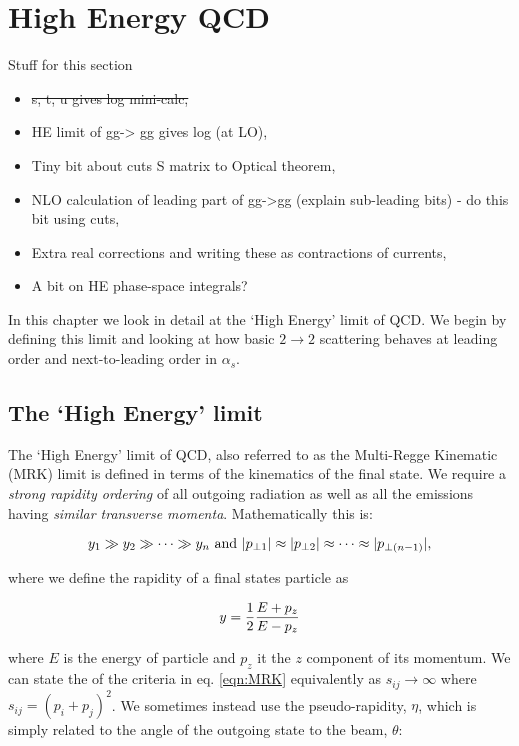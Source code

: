 \chapter{High Energy QCD}
\label{chap:HEQCD}

	{\color{red}
	Stuff for this section
	\begin{itemize}
		\item \st{s, t, u gives log mini-calc,}
		\item HE limit of gg-> gg gives log (at LO),
		\item Tiny bit about cuts S matrix to Optical theorem,
		\item NLO calculation of leading part of gg->gg (explain sub-leading bits) - do this bit using cuts,
		\item Extra real corrections and writing these as contractions of currents,
		\item A bit on HE phase-space integrals?
	\end{itemize}
	}

	In this chapter we look in detail at the `High Energy' limit of QCD.  We begin by defining this limit and
	looking at how basic $2\rightarrow2$ scattering behaves at leading order and next-to-leading order in
	$\alpha_s$.

	\section{The `High Energy' limit}
		\label{sub:HElimit}

		The `High Energy' limit of QCD, also referred to as the Multi-Regge Kinematic (MRK) limit is
		defined in terms of the kinematics of the final state.  We require a \emph{strong rapidity ordering}
		of all outgoing radiation as well as all the emissions having \emph{similar transverse momenta}.
		Mathematically this is:

		\begin{equation}
			y_1\gg y_2\gg\cdots\gg\\y_n \text{ and } |p_{\perp1}| \approx |p_{\perp2}| \approx\cdots\approx|p_{\perp(n-1)}|,
			\label{eqn:MRK}
		\end{equation}

  		where we define the rapidity of a final states particle as

		\begin{equation}
			y = \frac{1}{2}\frac{E+p_z}{E-p_z}
			\label{eqn:rap}
		\end{equation}

		where $E$ is the energy of particle and $p_z$ it the $z$ component of its momentum. We can
		state the of the criteria in eq. \eqref{eqn:MRK} equivalently as $s_{ij}\rightarrow\infty$ where
		$s_{ij} = (p_i + p_j)^2$.  We sometimes instead use the pseudo-rapidity, $\eta$, which is
		simply related to the angle of the outgoing state to the beam, $\theta$:

